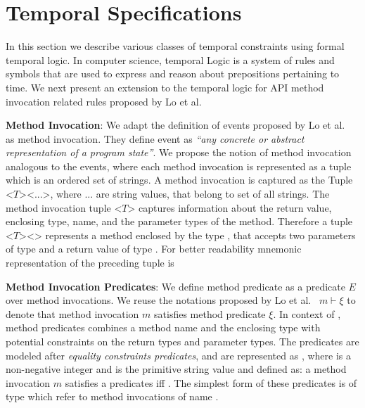 \section{Temporal Specifications}
\label{sec:temporal}

In this section we describe various classes of temporal constraints using formal temporal logic.
In computer science, temporal Logic is a system of rules and symbols that are used to express and reason about prepositions pertaining to time.
We next present an extension to the temporal logic for API method invocation related rules proposed by Lo et al.~\cite{lo2009mining}

\textbf{Method Invocation}: 
We adapt the definition of events proposed by Lo et al.~\cite{lo2009mining} as method invocation.
They define event as \textit{``any concrete or abstract representation of a program state''}. 
We propose the notion of method invocation analogous to the events,
where each method invocation is represented as a tuple which is an ordered set of strings. 
A method invocation is captured as the Tuple <$T$><...>, where ... are string values,
that belong to set of all strings.
The method invocation tuple <$T$> captures information about the return value, enclosing type, name, and the parameter types of the method.
Therefore a tuple <$T$><> represents a method  enclosed by the type ,
that accepts two parameters of type  and a return value of type . 
For better readability mnemonic representation of the preceding tuple is 



\textbf{Method Invocation Predicates}: We define method predicate as a predicate $E$ over method invocations.
We reuse the notations proposed by Lo et al.~\cite{lo2009mining} $m \vdash \xi$ to denote that method invocation $m$ satisfies method predicate $\xi$.
In context of \tool, method predicates combines a method name and the enclosing type with potential constraints on the return types and parameter types. 
The predicates are modeled after \textit{equality constraints predicates}, and are represented as , where  is a non-negative integer and  is the primitive string value and defined as: a method invocation $m$ satisfies a predicates  iff . The simplest form of these predicates is of type  which refer to method invocations of name .

